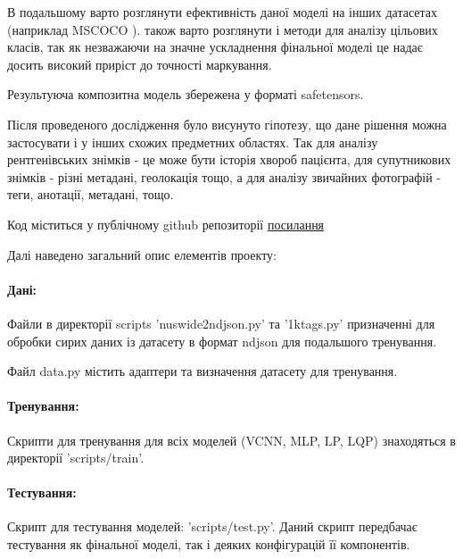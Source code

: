 \documentclass{udstu}
\begin{document}
В подальшому варто розглянути ефективність даної моделі на інших датасетах (наприклад MSCOCO \cite{cocodataset}).
також варто розглянути і методи для аналізу цільових класів, так як незважаючи на
значне ускладнення фінальної моделі це надає досить високий приріст до точності маркування.

Результуюча композитна модель збережена у форматі safetensors.

Після проведеного дослідження було висунуто гіпотезу, що дане рішення можна застосувати
і у інших схожих предметних областях. Так для аналізу рентгенівських знімків - це може бути історія хвороб пацієнта,
для супутникових знімків - різні метадані, геолокація тощо, а для аналізу звичайних фотографій
- теги, анотації, метадані, тощо.

\printbibliography


Код міститься у публічному github репозиторії
\underline{\href{https://github.com/skorodenko/wallpaper\_tagging}{посилання}}

Далі наведено загальний опис елементів проекту:


\paragraph{\textbf{Дані:}\\}

Файли в директорії scripts 'nuswide2ndjson.py' та '1ktags.py' призначенні для обробки
сирих даних із датасету в формат ndjson для подальшого тренування.

Файл data.py містить адаптери та визначення датасету для тренування.


\paragraph{\textbf{Тренування:}\\}

Скрипти для тренування для всіх моделей (VCNN, MLP, LP, LQP) знаходяться в директорії
'scripts/train'.


\paragraph{\textbf{Тестування:}\\}

Скрипт для тестування моделей: 'scripts/test.py'.
Даний скрипт передбачає тестування як фінальної моделі, так і деяких конфігурацій її компонентів.
\end{document}
